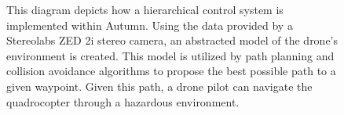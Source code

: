 \begin{figure}
	\centering
	
	\caption{
		This diagram depicts how a hierarchical control system is implemented within Autumn. Using the data provided by a Stereolabs ZED 2i stereo camera, an abstracted model of the drone's environment is created. This model is utilized by path planning and collision avoidance algorithms to propose the best possible path to a given waypoint. Given this path, a drone pilot can navigate the quadrocopter through a hazardous environment. 
	}
	\label{fig:autumnControlLoop}
\end{figure}


\filbreak